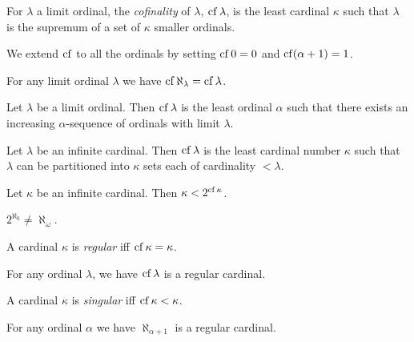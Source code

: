 \begin{definition}[Cofinality]
    For $\lambda$ a limit ordinal, the \emph{cofinality} of $\lambda$,
    $\operatorname{cf} \lambda$, is the least cardinal $\kappa$ such that $\lambda$ is the supremum
    of a set of $\kappa$ smaller ordinals.

    We extend $\operatorname{cf}$ to all the ordinals by setting $\operatorname{cf} 0 = 0$ and
    $\operatorname{cf} (\alpha + 1) = 1$.
\end{definition}

\begin{theorem}
    For any limit ordinal $\lambda$ we have $\operatorname{cf} \aleph_\lambda = \operatorname{cf} \lambda$.
\end{theorem}

\begin{lemma}
    Let $\lambda$ be a limit ordinal. Then $\operatorname{cf} \lambda$
    is the least ordinal $\alpha$ such that there exists an
    increasing $\alpha$-sequence of ordinals with limit $\lambda$.
\end{lemma}

\begin{theorem}
    Let $\lambda$ be an infinite cardinal. Then $\operatorname{cf} \lambda$
    is the least cardinal number $\kappa$ such that $\lambda$
    can be partitioned into $\kappa$ sets each of cardinality $< \lambda$.
\end{theorem}

\begin{theorem}
    Let $\kappa$ be an infinite cardinal. Then $\kappa < 2^{\operatorname{cf} \kappa}$.
\end{theorem}

\begin{corollary}
    $2^{\aleph_0} \neq \aleph_\omega$.
\end{corollary}
    
\begin{definition}[Regular]
    A cardinal $\kappa$ is \emph{regular} iff $\operatorname{cf} \kappa = \kappa$.
\end{definition}

\begin{theorem}
    For any ordinal $\lambda$, we have $\operatorname{cf} \lambda$ is a regular cardinal.
\end{theorem}

\begin{definition}[Singular]
    A cardinal $\kappa$ is \emph{singular} iff $\operatorname{cf} \kappa < \kappa$.
\end{definition}

\begin{theorem}
    For any ordinal $\alpha$ we have $\aleph_{\alpha + 1}$ is a regular cardinal.
\end{theorem}

